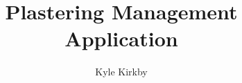 \documentclass{report}
\begin{document}
\title{Plastering Management Application}
\author{Kyle Kirkby}
\maketitle
\tableofcontents






\end{document}
